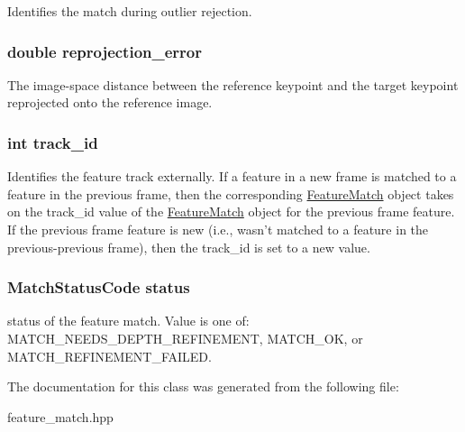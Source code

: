 Identifies the match during outlier rejection. \hypertarget{classfovis_1_1FeatureMatch_aed648d3f72076806d79f7c4c78151487}{
\subsubsection[{reprojection\_\-error}]{\setlength{\rightskip}{0pt plus 5cm}double {\bf reprojection\_\-error}}}
\label{classfovis_1_1FeatureMatch_aed648d3f72076806d79f7c4c78151487}
The image-\/space distance between the reference keypoint and the target keypoint reprojected onto the reference image. \hypertarget{classfovis_1_1FeatureMatch_a8e64acfab4c3eba5b36eb3b6f15b9434}{
\subsubsection[{track\_\-id}]{\setlength{\rightskip}{0pt plus 5cm}int {\bf track\_\-id}}}
\label{classfovis_1_1FeatureMatch_a8e64acfab4c3eba5b36eb3b6f15b9434}
Identifies the feature track externally. If a feature in a new frame is matched to a feature in the previous frame, then the corresponding \hyperlink{classfovis_1_1FeatureMatch}{FeatureMatch} object takes on the track\_\-id value of the \hyperlink{classfovis_1_1FeatureMatch}{FeatureMatch} object for the previous frame feature. If the previous frame feature is new (i.e., wasn't matched to a feature in the previous-\/previous frame), then the track\_\-id is set to a new value. \hypertarget{classfovis_1_1FeatureMatch_a5a17170db3bee9a227cb28782b9532a7}{
\subsubsection[{status}]{\setlength{\rightskip}{0pt plus 5cm}MatchStatusCode {\bf status}}}
\label{classfovis_1_1FeatureMatch_a5a17170db3bee9a227cb28782b9532a7}
status of the feature match. Value is one of: {\ttfamily MATCH\_\-NEEDS\_\-DEPTH\_\-REFINEMENT}, {\ttfamily MATCH\_\-OK}, or {\ttfamily MATCH\_\-REFINEMENT\_\-FAILED}. 

The documentation for this class was generated from the following file:\begin{DoxyCompactItemize}
\item 
feature\_\-match.hpp\end{DoxyCompactItemize}
